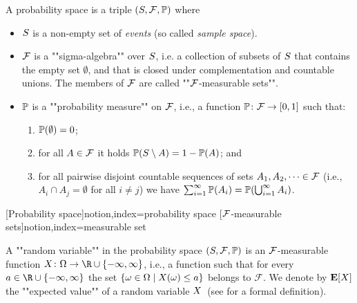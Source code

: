 \begin{definition}
\label{5-def:probspace}
A probability space is a triple
$(S,\mathcal{F},\mathbb{P})$ where
\begin{itemize}
\item $S$ is a non-empty set of \emph{events} (so called
\emph{sample space}). 

\item $\mathcal{F}$ is a ""sigma-algebra"" over $S$,
i.e. a collection of subsets of $S$ that contains the empty set
$\emptyset$, and that is closed under complementation and countable unions. The members of $\mathcal{F}$ are called ""$\mathcal{F}$-measurable 
sets"".

\item $\mathbb{P}$ is a ""probability measure"" on $\mathcal{F}$, i.e., a function
$\mathbb{P}\colon \mathcal{F}\rightarrow[0,1]$ such that:
\begin{enumerate}
\item $\mathbb{P}(\emptyset)=0$;

\item for all $A\in \mathcal{F}$ it holds $\mathbb{P}(S \setminus
A)=1-\mathbb{P}(A)$; and

\item for all pairwise disjoint countable sequences of sets $A_1,A_2,\dots \in \mathcal{F}$ (i.e., $A_i \cap A_j = \emptyset$ for all $i\neq j$)
we have $\sum_{i=1}^{\infty}\mathbb{P}(A_i)=\mathbb{P}(\bigcup_{i=1}^{\infty} A_i)$.
\end{enumerate}
\end{itemize}
\end{definition}

[Probability space]{notion,index={probability space}}
[$\mathcal{F}$-measurable 
sets]{notion,index={measurable set}}

A ""random variable"" in the probability space $(S,\mathcal{F},\mathbb{P})$ is an $\mathcal{F}$-measurable function $\rvar\colon \Omega \rightarrow \R \cup
\{-\infty,\infty\}$, i.e.,
a function such that for every $a\in \R \cup \{ -\infty,\infty\}$ the set
$\{\omega\in \Omega\mid X(\omega)\leq a\}$ belongs to $\mathcal{F}$. We denote by $\mathbf{E}[X]$ the ""expected value"" of a random variable $X$~(see \cite[Chapter 5]{Bil:1995}
for a formal definition).


